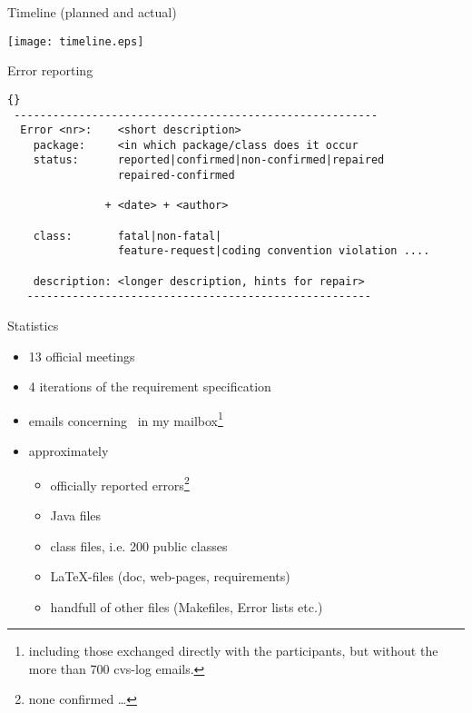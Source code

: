 \begin{myslide}{Timeline (planned and actual)}
  \begin{center}
    \texttt{[image: timeline.eps]}  
    \end{center}
\end{myslide}



\begin{myslide}{Error reporting}
  \begin{lstlisting}{}
 --------------------------------------------------------
  Error <nr>:    <short description>
    package:     <in which package/class does it occur
    status:      reported|confirmed|non-confirmed|repaired
                 repaired-confirmed

               + <date> + <author>
   
    class:       fatal|non-fatal|
                 feature-request|coding convention violation ....

    description: <longer description, hints for repair>
   -----------------------------------------------------
  \end{lstlisting}
\end{myslide}



\begin{myslide}{Statistics}
  \begin{itemize}
  \item 13 official meetings
  \item 4 iterations of the requirement specification
  \item {} emails concerning \Slime\ in my
    mailbox\footnote{including those exchanged directly with the
      participants, but without the more than 700 cvs-log emails.}
  \item approximately
    \begin{itemize}
    \item {} officially reported errors\footnote{none
        confirmed \ldots}
    \item {} Java files
    \item {} class files, i.e. 200 public classes
    \item {} \LaTeX-files (doc, web-pages, requirements)
    \item handfull of other files (Makefiles, Error lists etc.)
    \end{itemize}
  \end{itemize}
\end{myslide}





